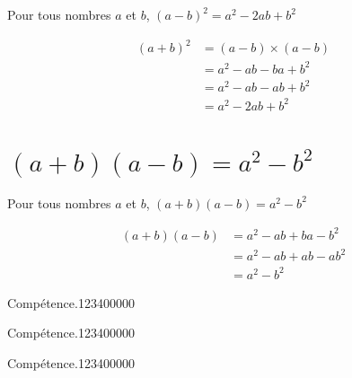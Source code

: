 \begin{pageCours}
\begin{Pp}
Pour tous nombres $a$ et $b$, $(a-b)^2=a^2-2ab+b^2$ 
\end{Pp}

\begin{Pv}
\begin{align*}
(a+b)^2&=(a-b)\times(a-b) \\
&=a^2-ab-ba+b^2 \\
&=a^2-ab-ab+b^2 \\
&=a^2-2ab+b^2
\end{align*}
\end{Pv}

\section{$(a+b)(a-b)=a^2-b^2$}

\begin{Pp}
Pour tous nombres $a$ et $b$, $(a+b)(a-b)=a^2-b^2$ 
\end{Pp}

\begin{Pv}
\begin{align*}
(a+b)(a-b)&=a^2-ab+ba-b^2 \\
&=a^2-ab+ab-ab^2 \\
&=a^2-b^2
\end{align*}
\end{Pv}

\end{pageCours} %


\begin{pageAD}  %
\restoregeometry %


\begin{ExoCad}{Compétence.}{1234}{0}{0}{0}{0}{0}

\end{ExoCad}


\begin{ExoCad}{Compétence.}{1234}{0}{0}{0}{0}{0}

\end{ExoCad}


\begin{ExoCad}{Compétence.}{1234}{0}{0}{0}{0}{0}

\end{ExoCad}
 
\end{pageAD} %

